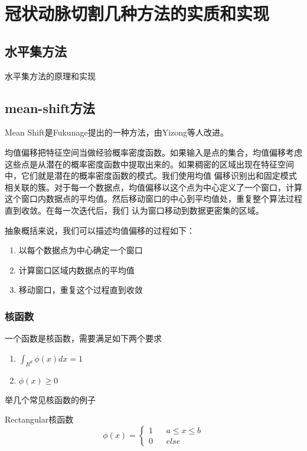 \chapter{冠状动脉切割几种方法的实质和实现}
\section{水平集方法}
水平集方法的原理和实现
\section{mean-shift方法}
Mean Shift是Fukunage提出的一种方法\cite{Cheng1995Mean}，由Yizong等人改进\cite{Cheng1995Mean}。



均值偏移把特征空间当做经验概率密度函数。如果输入是点的集合，均值偏移考虑这些点是从潜在的概率密度函数中提取出来的。如果稠密的区域出现在特征空间中，它们就是潜在的概率密度函数的模式。我们使用均值
偏移识别出和固定模式相关联的簇。对于每一个数据点，均值偏移以这个点为中心定义了一个窗口，计算这个窗口内数据点的平均值。然后移动窗口的中心到平均值处，重复整个算法过程直到收敛。在每一次迭代后，我们
认为窗口移动到数据更密集的区域。

抽象概括来说，我们可以描述均值偏移的过程如下：
\begin{enumerate}
  \item 以每个数据点为中心确定一个窗口
  \item 计算窗口区域内数据点的平均值
  \item 移动窗口，重复这个过程直到收敛
\end{enumerate}
\subsection{核函数}
一个函数是核函数，需要满足如下两个要求

\begin{enumerate}
  \item $\int_{R^d} \phi (x) dx = 1$
  \item $\phi (x) \geq 0 $
\end{enumerate}
举几个常见核函数的例子

Rectangular核函数
\begin{equation}\label{eq:kernel_rectangular}
\phi (x)=\left\{
\begin{aligned}
 1  && {a \leq x \leq b} \\
 0  && {else}
\end{aligned}
\right.
\end{equation}

